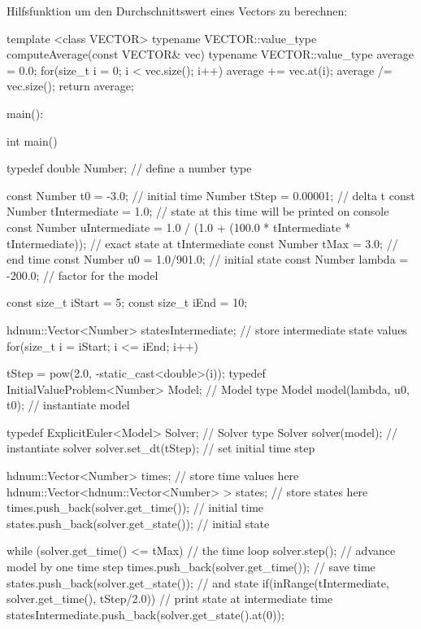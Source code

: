\documentclass[10pt,oneside,a4paper]{scrartcl}
\begin{document}
    Hilfsfunktion um den Durchschnittswert eines Vectors zu berechnen:
    
    \begin{cppcode}
template <class VECTOR>
typename VECTOR::value_type computeAverage(const VECTOR& vec) {
  typename VECTOR::value_type average = 0.0;
  for(size_t i = 0; i < vec.size(); i++) {
    average += vec.at(i);
  }
  average /= vec.size();
  return average;
}
    \end{cppcode}
    
    main():
    
    \begin{cppcode}
int main() {
    typedef double Number;                  // define a number type

    const Number t0             = -3.0;     // initial time
          Number tStep          = 0.00001;  // delta t
    const Number tIntermediate  = 1.0;      // state at this time will be printed on console
    const Number uIntermediate  = 1.0 / (1.0 + (100.0 * tIntermediate * tIntermediate)); // exact state at tIntermediate
    const Number tMax           = 3.0;       // end time
    const Number u0             = 1.0/901.0; // initial state
    const Number lambda         = -200.0;    // factor for the model

    const size_t iStart         = 5;
    const size_t iEnd           = 10;

    hdnum::Vector<Number> statesIntermediate;     // store intermediate state values
    for(size_t i = iStart; i <= iEnd; i++) {
      tStep = pow(2.0, -static_cast<double>(i));
      typedef InitialValueProblem<Number> Model; // Model type
      Model model(lambda, u0, t0);               // instantiate model

      typedef ExplicitEuler<Model> Solver;       // Solver type
      Solver solver(model);                      // instantiate solver
      solver.set_dt(tStep);                      // set initial time step

      hdnum::Vector<Number> times;               // store time values here
      hdnum::Vector<hdnum::Vector<Number> > states; // store states here
      times.push_back(solver.get_time());        // initial time
      states.push_back(solver.get_state());      // initial state

      while (solver.get_time() <= tMax)          // the time loop
      {
        solver.step();                           // advance model by one
        time step times.push_back(solver.get_time()); // save time
        states.push_back(solver.get_state());         // and state
        if(inRange(tIntermediate, solver.get_time(), tStep/2.0)) {  // print state at intermediate time
          statesIntermediate.push_back(solver.get_state().at(0)); 
        }
      }
    }

}
\end{cppcode}
\end{document}
